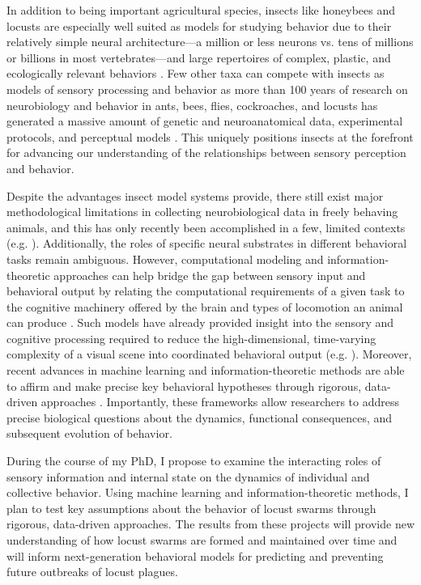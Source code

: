 \documentclass[11pt,a4paper,oneside]{book}
\begin{document}
	\par
	In addition to being important agricultural species, insects like honeybees and locusts are especially well suited as models for studying behavior due to their relatively simple neural architecture---a million or less neurons vs. tens of millions or billions in most vertebrates---and large repertoires of complex, plastic, and ecologically relevant behaviors \citep{haberkern2016studying}. Few other taxa can compete with insects as models of sensory processing and behavior as more than 100 years of research on neurobiology and behavior in ants, bees, flies, cockroaches, and locusts has generated a massive amount of genetic and neuroanatomical data, experimental protocols, and perceptual models \citep{menzel1983neurobiology,burrows1996neurobiology,feany2000drosophila,chittka2006recognition,north2007invertebrate,leonard2014multisensory,haberkern2016studying}. This uniquely positions insects at the forefront for advancing our understanding of the relationships between sensory perception and behavior.
	\par
	Despite the advantages insect model systems provide, there still exist major methodological limitations in collecting neurobiological data in freely behaving animals, and this has only recently been accomplished in a few, limited contexts (e.g. \citealp{martin2015central}). Additionally, the roles of specific neural substrates in different behavioral tasks remain ambiguous. However, computational modeling and information-theoretic approaches can help bridge the gap between sensory input and behavioral output by relating the computational requirements of a given task to the cognitive machinery offered by the brain and types of locomotion an animal can produce \citep{webb2016neural}. Such models have already provided insight into the sensory and cognitive processing required to reduce the high-dimensional, time-varying complexity of a visual scene into coordinated behavioral output (e.g. \citealp{bertrand2015bio,mischiati2015internal}). Moreover, recent advances in machine learning and information-theoretic methods are able to affirm and make precise key behavioral hypotheses through rigorous, data-driven approaches \citep{berman2014drosopholid,berman2014mapping,berman2016predictability,klibaite2017unsupervised,todd2017exploration,wiltschko2015,twomey2016vision}. Importantly, these frameworks allow researchers to address precise biological questions about the dynamics, functional consequences, and subsequent evolution of behavior. 
	\par
	During the course of my PhD, I propose to examine the interacting roles of sensory information and internal state on the dynamics of individual and collective behavior. Using machine learning and information-theoretic methods, I plan to test key assumptions about the behavior of locust swarms through rigorous, data-driven approaches. The results from these projects will provide new understanding of how locust swarms are formed and maintained over time and will inform next-generation behavioral models for predicting and preventing future outbreaks of locust plagues.
	
\end{document}
